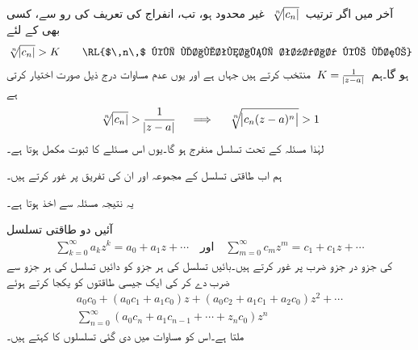آخر میں اگر ترتیب 
$\,\sqrt[\leftroot{-2}n]{\abs{c_n}}\,$
غیر محدود ہو، تب، انفراج کی تعریف کی رو سے، کسی بھی  کے لئے
\begin{align*}
\sqrt[\leftroot{-2}n]{\abs{c_n}}>K\quad\quad \text{\RL{$\,n\,$ کی لامتناہی تعداد کے لئے}}
\end{align*}
ہو گا۔ہم 
$\,K=\tfrac{1}{\abs{z-a}}\,$
منتخب کرتے ہیں جہاں  ہے اور یوں عدم مساوات درج ذیل صورت اختیار کرتی ہے
\begin{align*}
\sqrt[\leftroot{-2}n]{\abs{c_n}}>\frac{1}{\abs{z-a}} \quad \implies \quad \sqrt[\leftroot{-2}n]{\abs{c_n(z-a)^n}}>1
\end{align*}
لہٰذا مسئلہ  کے تحت تسلسل منفرج ہو گا۔یوں اس مسئلے کا ثبوت مکمل ہوتا ہے۔

ہم اب طاقتی تسلسل کے مجموعہ اور ان کی تفریق پر غور کرتے ہیں۔

  یہ نتیجہ مسئلہ  سے اخذ ہوتا ہے۔

آئیں دو طاقتی تسلسل 
\begin{align}\label{مساوات_ٹیلر_کوشی_حاصل_ضرب_الف}
\sum_{k=0}^{\infty} a_kz^k=a_0+a_1z+\cdots\quad \text{اور}\quad \sum_{m=0}^{\infty}c_mz^m=c_1+c_1z+\cdots
\end{align}
کی جزو در جزو ضرب پر غور کرتے ہیں۔بائیں تسلسل کی ہر جزو کو دائیں تسلسل  کی ہر جزو سے ضرب دے کر  کی ایک جیسی طاقتوں کو یکجا کرتے ہوئے
\begin{multline}\label{مساوات_ٹیلر_کوشی_حاصل_ضرب_ب}
a_0c_0+(a_0c_1+a_1c_0)z+(a_0c_2+a_1c_1+a_2c_0)z^2+\cdots\\
\sum\limits_{n=0}^{\infty} (a_0c_n+a_1c_{n-1}+\cdots+z_nc_0)z^n
\end{multline}
ملتا ہے۔اس کو مساوات  میں دی گئی تسلسلوں  کا  کہتے ہیں۔


